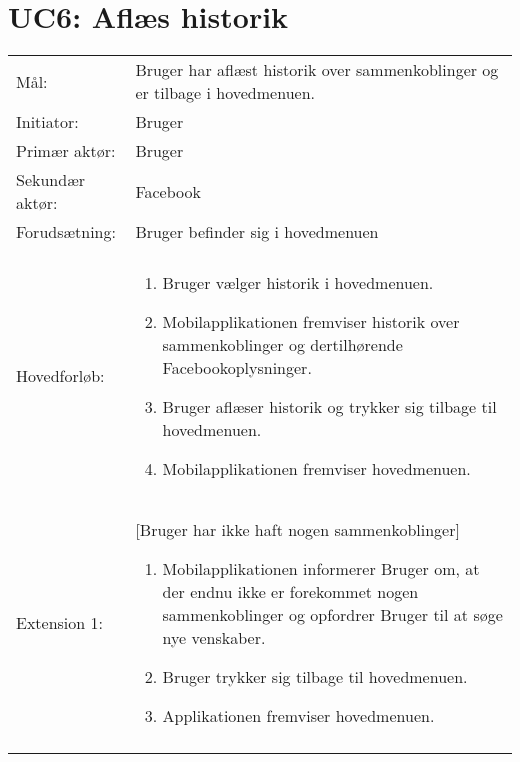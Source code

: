\newpage 

\section{UC6: Aflæs historik}
\begin{tabular}{ >{\raggedleft} p{3cm} | p{12cm} }
Mål: & Bruger har aflæst historik over sammenkoblinger og er tilbage i hovedmenuen. \\
Initiator: & Bruger \\
Primær aktør: & Bruger \\
Sekundær aktør: &  Facebook \\
Forudsætning: & Bruger befinder sig i hovedmenuen
 \\
 & \\
Hovedforløb:  & \begin{enumerate}[label=\arabic*.),itemjoin={\newline},topsep=0pt,partopsep=0pt,itemsep=0pt,leftmargin=*]   
\item Bruger vælger historik i hovedmenuen.
\item Mobilapplikationen fremviser historik over sammenkoblinger og dertilhørende Facebookoplysninger.  
\item Bruger aflæser historik og trykker sig tilbage til hovedmenuen.
\item Mobilapplikationen fremviser hovedmenuen.
\end{enumerate}\\
Extension 1: & [Bruger har ikke haft nogen sammenkoblinger]
\vspace{2 mm}
\begin{enumerate}[label=\arabic*.),itemjoin={\newline},topsep=0pt,partopsep=0pt,itemsep=0pt,leftmargin=*]   
\item Mobilapplikationen informerer Bruger om, at der endnu ikke er forekommet nogen sammenkoblinger og opfordrer Bruger til at søge nye venskaber.
\item Bruger trykker sig tilbage til hovedmenuen.
\item Applikationen fremviser hovedmenuen.
\end{enumerate} \\
& \\
\end{tabular}


